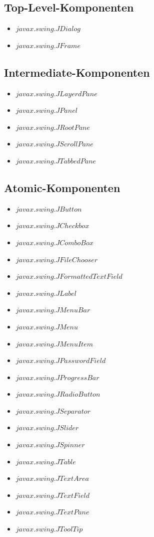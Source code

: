   \subsection{Top-Level-Komponenten}
  
  \begin{itemize}
    \item \(javax.swing.JDialog\)
    \item \(javax.swing.JFrame\)
  \end{itemize}
  
  \subsection{Intermediate-Komponenten}
  
  \begin{itemize}
    \item \(javax.swing.JLayerdPane\)
    \item \(javax.swing.JPanel\)
    \item \(javax.swing.JRootPane\)
    \item \(javax.swing.JScrollPane\)
    \item \(javax.swing.JTabbedPane\)
  \end{itemize}
  
  \subsection{Atomic-Komponenten}
  
  \begin{itemize}
    \item \(javax.swing.JButton\)
    \item \(javax.swing.JCheckbox\)
    \item \(javax.swing.JComboBox\)
    \item \(javax.swing.JFileChooser\)
    \item \(javax.swing.JFormattedTextField\)
    \item \(javax.swing.JLabel\)
    \item \(javax.swing.JMenuBar\)
    \item \(javax.swing.JMenu\)
    \item \(javax.swing.JMenuItem\)
    \item \(javax.swing.JPasswordField\)
    \item \(javax.swing.JProgressBar\)
    \item \(javax.swing.JRadioButton\)
    \item \(javax.swing.JSeparator\)
    \item \(javax.swing.JSlider\)
    \item \(javax.swing.JSpinner\)
    \item \(javax.swing.JTable\)
    \item \(javax.swing.JTextArea\)
    \item \(javax.swing.JTextField\)
    \item \(javax.swing.JTextPane\)
    \item \(javax.swing.JToolTip\)
  \end{itemize}
  
